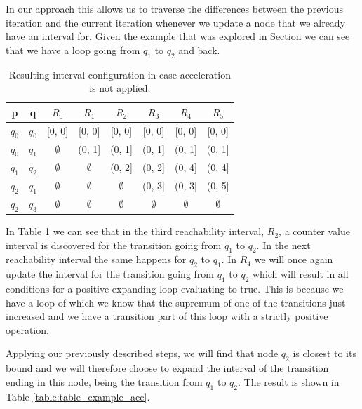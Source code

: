 \documentclass[12pt]{article}
\begin{document}
In our approach this allows us to traverse the differences between the previous iteration and the current iteration whenever we update a node that we already have an interval for. Given the example that was explored in Section  we can see that we have a loop going from $q_1$ to $q_2$ and back. 

\begin{table}[h]
	\begin{tabular}{ |c|c|c|c|c|c|c|c| }
		\hline
		p		& q 	& $R_0$ 		& $R_1$			& $R_2$			& $R_3$			& $R_4$ 		& $R_5$ \\
		\hline
		$q_0$	& $q_0$ & [0, 0] 		& [0, 0] 		& [0, 0] 		& [0, 0]		& [0, 0]		& [0, 0] \\
		$q_0$	& $q_1$ & $\emptyset$ 	& (0, 1]		& (0, 1] 		& (0, 1]		& (0, 1] 		& (0, 1] \\
		$q_1$	& $q_2$ & $\emptyset$ 	& $\emptyset$ 	& (0, 2] 		& (0, 2]		& (0, 4] 		& (0, 4] \\
		$q_2$	& $q_1$ & $\emptyset$ 	& $\emptyset$ 	& $\emptyset$	& (0, 3]		& (0, 3] 		& (0, 5] \\
		$q_2$	& $q_3$ & $\emptyset$ 	& $\emptyset$ 	& $\emptyset$	& $\emptyset$	& $\emptyset$	& $\emptyset$ \\
		\hline
	\end{tabular}
	\centering
	\caption{Resulting interval configuration in case acceleration is not applied.}
	\label{table:table_example_no_acc}
\end{table}

In Table \ref{table:table_example_no_acc} we can see that in the third reachability interval, $R_2$, a counter value interval is discovered for the transition going from $q_1$ to $q_2$. In the next reachability interval the same happens for $q_2$ to $q_1$. In $R_4$ we will once again update the interval for the transition going from $q_1$ to $q_2$ which will result in all conditions for a positive expanding loop evaluating to true. This is because we have a loop of which we know that the supremum of one of the transitions just increased and we have a transition part of this loop with a strictly positive operation.

Applying our previously described steps, we will find that node $q_2$ is closest to its bound and we will therefore choose to expand the interval of the transition ending in this node, being the transition from $q_1$ to $q_2$. The result is shown in Table \ref{table:table_example_acc}.
\end{document}
